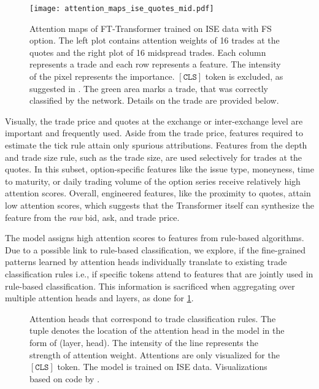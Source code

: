 \begin{figure}[h!]
    \centering
    \texttt{[image: attention\_maps\_ise\_quotes\_mid.pdf]}
    \caption[Attention Maps of FT-Transformer]{Attention maps of FT-Transformer trained on \gls{ISE} data with \gls{FS} option. The left plot contains attention weights of \num{16} trades at the quotes and the right plot of \num{16} midspread trades. Each column represents a trade and each row represents a feature. The intensity of the pixel represents the importance. $\mathtt{[CLS]}$ token is excluded, as suggested in \textcite[][400]{cheferGenericAttentionmodelExplainability2021}. The green area marks a trade, that was correctly classified by the network. Details on the trade are provided below.}
    \label{fig:attention-maps-ise}
\end{figure}

Visually, the trade price and quotes at the exchange or inter-exchange level are important and frequently used. Aside from the trade price, features required to estimate the tick rule attain only spurious attributions. Features from the depth and trade size rule, such as the trade size, are used selectively for trades at the quotes. In this subset, option-specific features like the issue type, moneyness, time to maturity, or daily trading volume of the option series receive relatively high attention scores.  Overall, engineered features, like the proximity to quotes, attain low attention scores, which suggests that the Transformer itself can synthesize the feature from the \emph{raw} bid, ask, and trade price.

The model assigns high attention scores to features from rule-based algorithms. Due to a possible link to rule-based classification, we explore, if the fine-grained patterns learned by attention heads individually translate to existing trade classification rules i.e., if specific tokens attend to features that are jointly used in rule-based classification. This information is sacrificed when aggregating over multiple attention heads and layers, as done for \cref{fig:attention-maps-ise}.

\begin{figure}[h!]
    \hfill
    \hfill
    \caption[Rule-Like Roles of Selected Attention Heads]{Attention heads that correspond to trade classification rules. The tuple denotes the location of the attention head in the model in the form of (layer, head). The intensity of the line represents the strength of attention weight. Attentions are only visualized for the $\mathtt{[CLS]}$ token. The model is trained on \gls{ISE} data. Visualizations based on code by \textcite[][279]{clarkWhatDoesBERT2019}.}
    \label{fig:rule-like-attention-heads}
\end{figure}

